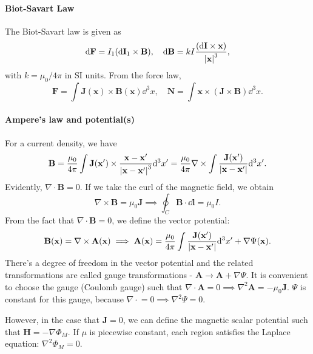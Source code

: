 \documentclass{article}
\begin{document}
\paragraph{Biot-Savart Law}
The Biot-Savart law is given as 
$$\dd\mathbf F=I_1(\dd\mathbf I_1\times\mathbf B),\quad\dd\mathbf B=kI\frac{(\dd\mathbf I\times\mathbf x)}{\left\lvert\mathbf x\right\rvert^3},$$
with $k=\mu_0/4\pi$ in SI units. From the force law, 
$$\mathbf F=\int\mathbf J(\mathbf x)\times\mathbf B(\mathbf x)\dd^3x,\quad\mathbf N=\int\mathbf x\times(\mathbf J\times\mathbf B)\dd^3x.$$
\paragraph{Ampere's law and potential(s)} For a current density, we have 
$$\mathbf B=\frac{\mu_0}{4\pi}\int\mathbf J(\mathbf x')\times\frac{\mathbf x-\mathbf x'}{\left\lvert\mathbf x-\mathbf x'\right\rvert^3}\dd^3x'=\frac{\mu_0}{4\pi}\nabla\times\int\frac{\mathbf J(\mathbf x')}{\left\lvert\mathbf x-\mathbf x'\right\rvert}\dd^3x'.$$
Evidently, $\nabla\cdot\mathbf B=0$. If we take the curl of the magnetic field, we obtain
$$\nabla\times\mathbf B=\mu_0\mathbf J\implies\oint_C\mathbf B\cdot\dd\mathbf l=\mu_0I.$$
From the fact that $\nabla\cdot\mathbf B=0$, we define the vector potential:
$$\mathbf B(\mathbf x)=\nabla\times\mathbf A(\mathbf x)\implies\mathbf A(\mathbf x)=\frac{\mu_0}{4\pi}\int\frac{\mathbf J(\mathbf x')}{\left\lvert\mathbf x -\mathbf x'\right\rvert}\dd^3x'+\nabla\Psi(\mathbf x).$$
There's a degree of freedom in the vector potential and the related transformations are called gauge transformations - $\mathbf A\to\mathbf A+\nabla\Psi$. It is convenient to choose the gauge (Coulomb gauge) such that $\nabla\cdot\mathbf A=0\implies\nabla^2\mathbf A=-\mu_0\mathbf J$. $\Psi$ is constant for this gauge, because $\nabla\cdot\mathbf =0\implies\nabla^2\Psi=0$.

However, in the case that $\mathbf J=0$, we can define the magnetic scalar potential such that $\mathbf H=-\nabla\Phi_M$. If $\mu$ is piecewise constant, each region satisfies the Laplace equation: $\nabla^2\Phi_M=0$.
\end{document}
